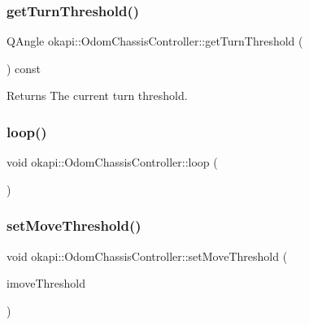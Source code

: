\subsubsection{\texorpdfstring{getTurnThreshold()}{getTurnThreshold()}}
{\footnotesize\ttfamily Q\+Angle okapi\+::\+Odom\+Chassis\+Controller\+::get\+Turn\+Threshold (\begin{DoxyParamCaption}{ }\end{DoxyParamCaption}) const\hspace{0.3cm}{\ttfamily [virtual]}}

\begin{DoxyReturn}{Returns}
The current turn threshold. 
\end{DoxyReturn}
\mbox{\label{classokapi_1_1OdomChassisController_aafdbc13dae2d14e13b879dd7d93993c7}} 
\subsubsection{\texorpdfstring{loop()}{loop()}}
{\footnotesize\ttfamily void okapi\+::\+Odom\+Chassis\+Controller\+::loop (\begin{DoxyParamCaption}{ }\end{DoxyParamCaption})\hspace{0.3cm}{\ttfamily [protected]}}

\mbox{\label{classokapi_1_1OdomChassisController_adf98b0e1b91d1f72cce5b76b992257a0}} 
\subsubsection{\texorpdfstring{setMoveThreshold()}{setMoveThreshold()}}
{\footnotesize\ttfamily void okapi\+::\+Odom\+Chassis\+Controller\+::set\+Move\+Threshold (\begin{DoxyParamCaption}\item[{const Q\+Length \&}]{imove\+Threshold }\end{DoxyParamCaption})\hspace{0.3cm}{\ttfamily [virtual]}}

